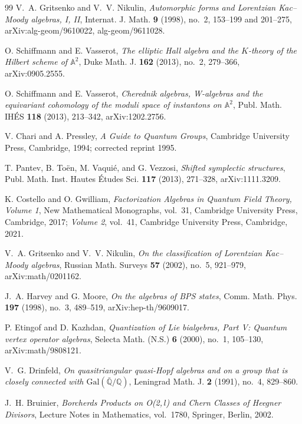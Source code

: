 \begin{thebibliography}{99}
V.~A. Gritsenko and V.~V. Nikulin, \emph{Automorphic forms and Lorentzian Kac--Moody algebras, I, II}, Internat. J. Math. \textbf{9} (1998), no.~2, 153--199 and 201--275, arXiv:alg-geom/9610022, alg-geom/9611028.

O. Schiffmann and E. Vasserot, \emph{The elliptic Hall algebra and the $K$-theory of the Hilbert scheme of $\mathbb{A}^2$}, Duke Math. J. \textbf{162} (2013), no.~2, 279--366, arXiv:0905.2555.

O. Schiffmann and E. Vasserot, \emph{Cherednik algebras, W-algebras and the equivariant cohomology of the moduli space of instantons on $\mathbb{A}^2$}, Publ. Math. IH\'ES \textbf{118} (2013), 213--342, arXiv:1202.2756.

V. Chari and A. Pressley, \emph{A Guide to Quantum Groups}, Cambridge University Press, Cambridge, 1994; corrected reprint 1995.

T. Pantev, B. To\"en, M. Vaqui\'e, and G. Vezzosi, \emph{Shifted symplectic structures}, Publ. Math. Inst. Hautes \'Etudes Sci. \textbf{117} (2013), 271--328, arXiv:1111.3209.

K. Costello and O. Gwilliam, \emph{Factorization Algebras in Quantum Field Theory, Volume 1}, New Mathematical Monographs, vol.~31, Cambridge University Press, Cambridge, 2017; \emph{Volume 2}, vol.~41, Cambridge University Press, Cambridge, 2021.

V.~A. Gritsenko and V.~V. Nikulin, \emph{On the classification of Lorentzian Kac--Moody algebras}, Russian Math. Surveys \textbf{57} (2002), no.~5, 921--979, arXiv:math/0201162.

J.~A. Harvey and G. Moore, \emph{On the algebras of BPS states}, Comm. Math. Phys. \textbf{197} (1998), no.~3, 489--519, arXiv:hep-th/9609017.

P. Etingof and D. Kazhdan, \emph{Quantization of Lie bialgebras, Part V: Quantum vertex operator algebras}, Selecta Math. (N.S.) \textbf{6} (2000), no.~1, 105--130, arXiv:math/9808121.

V.~G. Drinfeld, \emph{On quasitriangular quasi-Hopf algebras and on a group that is closely connected with $\mathrm{Gal}(\bar{\mathbb{Q}}/\mathbb{Q})$}, Leningrad Math. J. \textbf{2} (1991), no.~4, 829--860.

J.~H. Bruinier, \emph{Borcherds Products on O(2,\,$l$) and Chern Classes of Heegner Divisors}, Lecture Notes in Mathematics, vol.~1780, Springer, Berlin, 2002.


\end{thebibliography}
